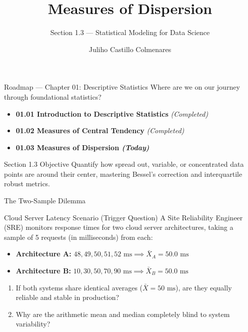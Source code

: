 \documentclass[aspectratio=169,xcolor={dvipsnames,table}]{beamer}
\title{Measures of Dispersion}
\subtitle{Section 1.3 — Statistical Modeling for Data Science}
\author[J. Castillo Colmenares]{Juliho Castillo Colmenares}
\institute{Tecnológico de Monterrey}
\date{}
\begin{document}
\begin{frame}[plain]
  \titlepage
\end{frame}

\begin{frame}{Roadmap — Chapter 01: Descriptive Statistics}
  Where are we on our journey through foundational statistics? \pause
  \begin{itemize}
    \item \textbf{01.01 Introduction to Descriptive Statistics} \emph{(Completed)} \pause
    \item \textbf{01.02 Measures of Central Tendency} \emph{(Completed)} \pause
    \item \color{TecRojo}\textbf{01.03 Measures of Dispersion \emph{(Today)}}\color{black}
  \end{itemize}
  \vspace{1em}
  \begin{block}{Section 1.3 Objective}
    Quantify how spread out, variable, or concentrated data points are around their center, mastering Bessel's correction and interquartile robust metrics.
  \end{block}
\end{frame}

\begin{frame}{The Two-Sample Dilemma}
  \begin{alertblock}{Cloud Server Latency Scenario (Trigger Question)}
    A Site Reliability Engineer (SRE) monitors response times for two cloud server architectures, taking a sample of 5 requests (in milliseconds) from each:
    \vspace{0.4em}
    \begin{itemize}
      \item \textbf{Architecture A:} $48, 49, 50, 51, 52 \text{ ms} \implies \bar{X}_A = 50.0 \text{ ms}$
      \item \textbf{Architecture B:} $10, 30, 50, 70, 90 \text{ ms} \implies \bar{X}_B = 50.0 \text{ ms}$
    \end{itemize}
    \vspace{0.4em}
    \begin{enumerate}
      \item If both systems share identical averages ($\bar{X} = 50 \text{ ms}$), are they equally reliable and stable in production? \pause
      \item Why are the arithmetic mean and median completely blind to system variability?
    \end{enumerate}
  \end{alertblock}
\end{frame}
\end{document}
